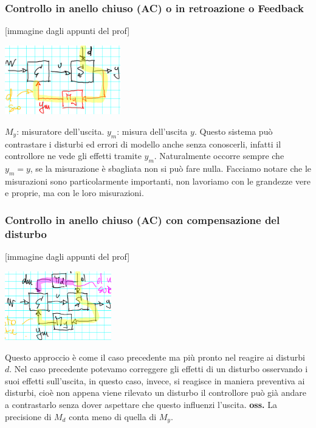 \subsubsection{Controllo in anello chiuso (AC) o in retroazione o Feedback}
[immagine dagli appunti del prof]
\begin{center}
    \includegraphics[height=3cm]{../lezione1/img4.PNG}
\end{center}
$M_y$: misuratore dell'uscita.\newline
$y_m$: misura dell'uscita $y$.\newline
Questo sistema può contrastare i disturbi ed errori di modello anche senza conoscerli, infatti il controllore ne vede gli effetti tramite $y_m$.\newline
Naturalmente occorre sempre che $y_m = y$, se la misurazione è sbagliata non si può fare nulla. Facciamo notare che le misurazioni sono particolarmente importanti, non lavoriamo con le grandezze vere e proprie, ma con le loro misurazioni.
\subsubsection{Controllo in anello chiuso (AC) con compensazione del disturbo}
[immagine dagli appunti del prof]
\begin{center}
    \includegraphics[height=3cm]{../lezione1/img5.PNG}
\end{center}
Questo approccio è come il caso precedente ma più pronto nel reagire ai disturbi $d$. Nel caso precedente potevamo correggere gli effetti di un disturbo osservando i suoi effetti sull'uscita, in questo caso, invece, si reagisce in maniera preventiva ai disturbi, cioè non appena viene rilevato un disturbo il controllore può già andare a contrastarlo senza dover aspettare che questo influenzi l'uscita.\newline
\textbf{oss.} La precisione di $M_d$ conta meno di quella di $M_y$.
